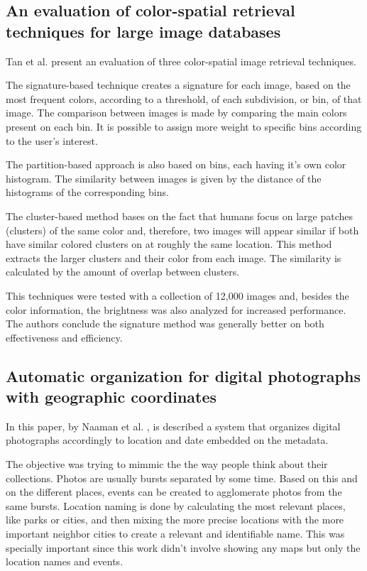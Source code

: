
\newpage
\subsection{An evaluation of color-spatial retrieval techniques for large image databases} %
\label{sub:Tan}

Tan et al. \cite{Tan:2001p850} present an evaluation of three color-spatial image retrieval techniques.

The signature-based technique creates a signature for each image, based on the most frequent colors, according to a threshold, of each subdivision, or bin, of that image. The comparison between images is made by comparing the main colors present on each bin. It is possible to assign more weight to specific bins according to the user's interest.

The partition-based approach is also based on bins, each having it's own color histogram. The similarity between images is given by the distance of the histograms of the corresponding bins.

The cluster-based method bases on the fact that humans focus on large patches (clusters) of the same color and, therefore, two images will appear similar if both have similar colored clusters on at roughly the same location. This method extracts the larger clusters and their color from each image. The similarity is calculated by the amount of overlap between clusters.

This techniques were tested with a collection of 12,000 images and, besides the color information, the brightness was also analyzed for increased performance. The authors conclude the signature method was generally better on both effectiveness and efficiency.


\subsection{Automatic organization for digital photographs with geographic coordinates} %
\label{sub:Naaman}

In this paper, by Naaman et al. \cite{Naaman:2004p1802}, is described a system that organizes digital photographs accordingly to location and date embedded on the metadata.

The objective was trying to mimmic the the way people think about their collections. Photos are usually bursts separated by some time. Based on this and on the different places, events can be created to agglomerate photos from the same bursts. Location naming is done by calculating the most relevant places, like parks or cities, and then mixing the more precise locations with the more important neighbor cities to create a relevant and identifiable name. This was specially important since this work didn't involve showing any maps but only the location names and events.

